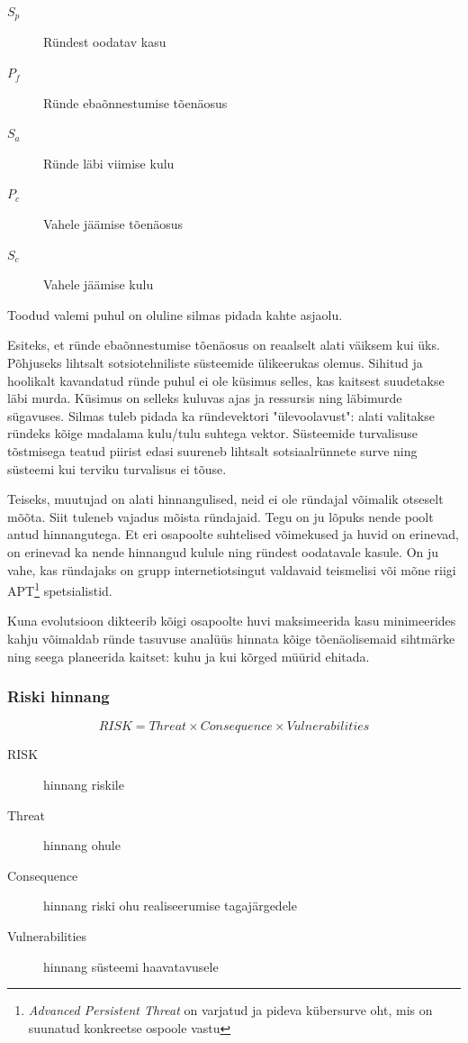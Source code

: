 \documentclass{article}
\begin{document}
	\begin{description}
		\item[$S_p$] Ründest oodatav kasu
		\item[$P_f$] Ründe ebaõnnestumise tõenäosus
		\item[$S_a$] Ründe läbi viimise kulu
		\item[$P_c$] Vahele jäämise tõenäosus
		\item[$S_c$] Vahele jäämise kulu
	\end{description}

Toodud valemi puhul on oluline silmas pidada kahte asjaolu. 

Esiteks, et ründe ebaõnnestumise tõenäosus on reaalselt alati väiksem kui üks. Põhjuseks lihtsalt sotsiotehniliste süsteemide ülikeerukas olemus. Sihitud ja hoolikalt kavandatud ründe puhul ei ole küsimus selles, kas kaitsest suudetakse läbi murda. Küsimus on selleks kuluvas ajas ja ressursis ning läbimurde sügavuses. Silmas tuleb pidada ka ründevektori "ülevoolavust": alati valitakse ründeks kõige madalama kulu/tulu suhtega vektor. Süsteemide turvalisuse tõstmisega teatud piirist edasi suureneb lihtsalt sotsiaalrünnete surve ning süsteemi kui terviku turvalisus ei tõuse. 

Teiseks, muutujad on alati hinnangulised, neid ei ole ründajal võimalik otseselt mõõta. Siit tuleneb vajadus mõista ründajaid. Tegu on ju lõpuks nende poolt antud hinnangutega. Et eri osapoolte suhtelised võimekused ja huvid on erinevad, on erinevad ka nende hinnangud kulule ning ründest oodatavale kasule. On ju vahe, kas ründajaks on grupp internetiotsingut valdavaid teismelisi või mõne riigi APT\footnote{\emph{Advanced Persistent Threat} on varjatud ja pideva kübersurve oht, mis on suunatud konkreetse ospoole vastu} spetsialistid. 

Kuna evolutsioon dikteerib kõigi osapoolte huvi maksimeerida kasu minimeerides kahju võimaldab ründe tasuvuse analüüs hinnata kõige tõenäolisemaid sihtmärke ning seega planeerida kaitset: kuhu ja kui kõrged müürid ehitada. 

\subsubsection{Riski hinnang}

\begin{equation}
	RISK = Threat \times Consequence \times Vulnerabilities
	\label{eq:risk}
\end{equation}

\begin{description}
	\item[RISK] hinnang riskile
	\item[Threat] hinnang ohule
	\item[Consequence] hinnang riski ohu realiseerumise tagajärgedele
	\item[Vulnerabilities] hinnang süsteemi haavatavusele
\end{description}
\end{document}
